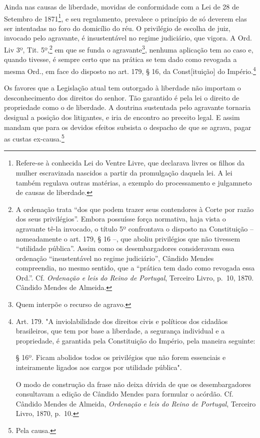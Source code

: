 Ainda nas causas de liberdade, movidas de conformidade com a Lei de 28
de Setembro de 1871\footnote{Refere-se à conhecida Lei do Ventre Livre,
  que declarava livres os filhos da mulher escravizada nascidos a partir
  da promulgação daquela lei. A lei também regulava outras matérias, a
  exemplo do processamento e julgamneto de causas de liberdade.}, e seu
regulamento, prevalece o princípio de só deverem elas ser intentadas no
foro do domicílio do réu. O privilégio de escolha de juiz, invocado pelo
agravante, é insustentável no regime judiciário, que vigora. A Ord. Liv
3º, Tit. 5º,\footnote{A ordenação trata ``dos que podem trazer seus
  contendores à Corte por razão dos seus privilégios''. Embora possuísse
  força normativa, haja vista o agravante tê-la invocado, o título 5º
  confrontava o disposto na Constituição -- nomeadamente o art. 179, §
  16 --, que aboliu privilégios que não tivessem ``utilidade pública''.
  Assim como os desembargadores consideravam essa ordenação
  ``insustentável no regime judiciário'', Cândido Mendes compreendia, no
  mesmo sentido, que a ``prática tem dado como revogada essa Ord.''. Cf.
  \emph{Ordenação e leis do Reino de Portugal}, Terceiro Livro, p.~10,
  1870. Cândido Mendes de Almeida.} em que se funda o
agravante\footnote{Quem interpõe o recurso de agravo.}, nenhuma
aplicação tem ao caso e, quando tivesse, é sempre certo que na prática
se tem dado como revogada a mesma Ord., em face do disposto no art. 179,
§ 16, da Const{[}ituição{]} do Império.\footnote{Art. 179. "A
  inviolabilidade dos direitos civis e políticos dos cidadãos
  brasileiros, que tem por base a liberdade, a segurança individual e a
  propriedade, é garantida pela Constituição do Império, pela maneira
  seguinte:

  § 16º. Ficam abolidos todos os privilégios que não forem essenciais e
  inteiramente ligados aos cargos por utilidade pública".

  O modo de construção da frase não deixa dúvida de que os
  desembargadores consultavam a edição de Cândido Mendes para formular o
  acórdão. Cf. Cândido Mendes de Almeida, \emph{Ordenação e leis do
  Reino de Portugal}, Terceiro Livro, 1870, p.~10.}

Os favores que a Legislação atual tem outorgado à liberdade não importam
o desconhecimento dos direitos do senhor. Tão garantido é pela lei o
direito de propriedade como o de liberdade. A doutrina sustentada pelo
agravante tornaria desigual a posição dos litigantes, e iria de encontro
ao preceito legal. E assim mandam que para os devidos efeitos subsista o
despacho de que se agrava, pagar as custas ex-causa.\footnote{Pela
  causa.}

